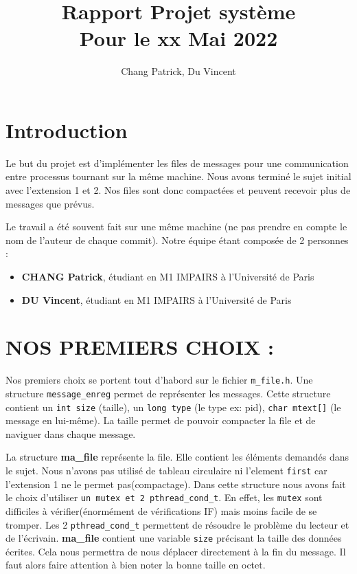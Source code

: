 \documentclass{article}
\title{Rapport Projet système\\ Pour le xx Mai 2022}
\author{Chang Patrick, Du Vincent}
\begin{document}
\maketitle


\section{Introduction}
Le but du projet est d’implémenter les files de messages pour une communication entre
processus tournant sur la même machine. Nous avons terminé le sujet initial avec l'extension 1 et 2.
Nos files sont donc compactées et peuvent recevoir plus de messages que prévus.

Le travail a été souvent fait sur une même machine (ne pas prendre en compte le nom de l'auteur de chaque commit).
Notre équipe étant composée de 2 personnes :

\begin{itemize}
\item {\bf CHANG Patrick}, étudiant en M1 IMPAIRS à l'Université de Paris
\item {\bf DU Vincent}, étudiant en M1 IMPAIRS à l'Université de Paris
\end{itemize}

\section{NOS PREMIERS CHOIX :}

Nos premiers choix se portent tout d'habord sur le fichier {\tt m\_file.h}.
Une structure {\tt message\_enreg} permet de représenter les messages.
Cette structure contient un {\tt int size} (taille), un {\tt long type} (le type ex: pid),
{\tt char mtext[]} (le message en lui-même).
La taille permet de pouvoir compacter la file et de naviguer dans chaque message.

La structure {\bf ma\_file} représente la file. Elle contient les éléments demandés dans le sujet.
Nous n'avons pas utilisé de tableau circulaire ni l'element {\tt first}
car l'extension 1 ne le permet pas(compactage).
Dans cette structure nous avons fait le choix d'utiliser {\tt un mutex et 2 pthread\_cond\_t}.
En effet, les {\tt mutex} sont difficiles à vérifier(énormément de vérifications IF) mais
moins facile de se tromper. Les 2 {\tt pthread\_cond\_t} permettent de résoudre le problème
du lecteur et de l'écrivain.
{\bf ma\_file} contient une variable {\tt size} précisant la taille des données écrites. Cela nous permettra
de nous déplacer directement à la fin du message. Il faut alors faire attention à bien
noter la bonne taille en octet.
\end{document}
